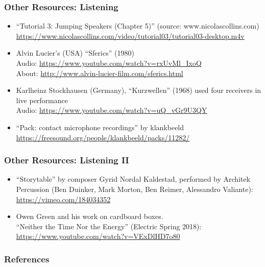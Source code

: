 \documentclass[screen, aspectratio=43]{beamer}
\begin{document}
\begin{frame}
  \frametitle{Other Resources: Listening}
    \begin{itemize}
    \item ``Tutorial 3: Jumping Speakers (Chapter 5)'' (source: www.nicolascollins.com)\\
    \url{https://www.nicolascollins.com/video/tutorial03/tutorial03-desktop.m4v}
    \item Alvin Lucier's (USA) ``Sferics'' (1980)\\
    Audio: \url{https://www.youtube.com/watch?v=rxUvMl_IxoQ}\\
    About: \url{http://www.alvin-lucier-film.com/sferics.html}
    \item Karlheinz Stockhausen (Germany), ``Kurzwellen'' (1968) used four receivers in live performance\\
    Audio: \url{https://www.youtube.com/watch?v=uQ_vGr9U3QY}
    \item ``Pack: contact microphone recordings'' by klankbeeld\\
    \url{https://freesound.org/people/klankbeeld/packs/11282/}
    \end{itemize}
\end{frame}
%
\begin{frame}
  \frametitle{Other Resources: Listening II}
    \begin{itemize}
    \item ``Storytable'' by composer Gyrid Nordal Kaldestad, performed by Architek Percussion (Ben Duinker, Mark Morton, Ben Reimer, Alessandro Valiante):\\
    \url{https://vimeo.com/184034352}
    \item Owen Green and his work on cardboard boxes. \\
    ``Neither the Time Nor the Energy'' (Electric Spring 2018): \url{https://www.youtube.com/watch?v=VExDlHD7o80}
    \end{itemize}
\end{frame}
%
\begin{frame}
  \frametitle{References}
  \printbibliography
\end{frame}
%
\end{document}
